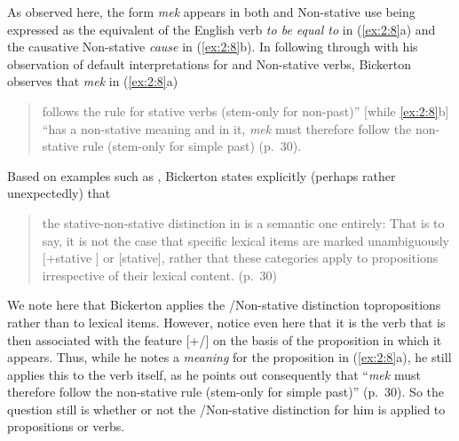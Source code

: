 As observed here, the form \textit{mek} appears in both  and
Non-stative use being expressed as the equivalent of the English
 verb \textit{to be equal to} in (\ref{ex:2:8}a) and the causative
Non-stative \textit{cause} in (\ref{ex:2:8}b).  In following through with his
observation of default  interpretations for  and
Non-stative verbs, Bickerton observes that \textit{mek} in
(\ref{ex:2:8}a)

\begin{quote}
follows the rule for stative verbs (stem-only for non-past)” [while
\ref{ex:2:8}b] ``has a non-stative meaning and in it, \textit{mek}
must therefore follow the non-stative rule (stem-only for simple past)
(p.~30).
\end{quote}

Based on examples such as , Bickerton states explicitly
(perhaps rather unexpectedly) that

\begin{quote}
the stative-non-stative distinction in  is a semantic
one entirely: That is to say, it is not the case that specific lexical
items are marked unambiguously [+stative ] or [\textminus stative], rather that
these categories apply to propositions irrespective of their lexical
content. (p.~30)
\end{quote}

We note here that Bickerton applies the \slash Non-stative
distinction to\linebreak propositions rather than to lexical items.  However,
notice even here that it is the verb that is then associated with the
feature [+/\textminus {}] on the basis of the proposition in which it
appears.  Thus, while he notes a  \textit{meaning} for the
proposition in (\ref{ex:2:8}a), he still applies this to the verb
itself, as he points out consequently that ``\textit{mek} must
therefore follow the non-stative rule (stem-only for simple past)”
(p.~30).  So the question still is whether or not the
\slash Non-stative distinction for him is applied to propositions or
verbs.

